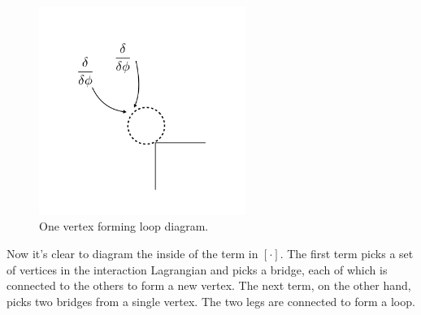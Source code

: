 \documentclass[12pt,halfline,a4paper]{ouparticle}
\begin{document}
\begin{figure}[h!]
	\centering
	\includegraphics[width=0.6\textwidth]{Fig6.jpeg}
	\caption{One vertex forming loop diagram.}
	\label{fig:polchinski2}
\end{figure}
Now it's clear to diagram the inside of the term in $[\cdot]$. The first term picks a set of vertices in the interaction Lagrangian and picks a bridge, each of which is connected to the others to form a new vertex. The next term, on the other hand, picks two bridges from a single vertex. The two legs are connected to form a loop.
\end{document}
